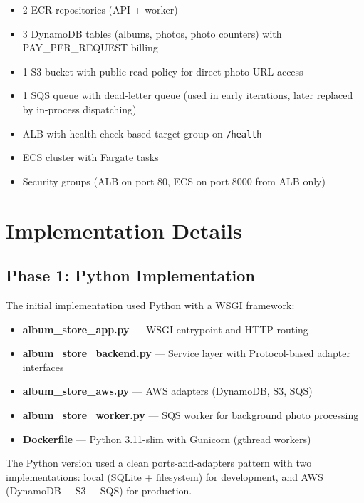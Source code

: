 \documentclass[11pt]{article}
\begin{document}
\begin{itemize}
    \item 2 ECR repositories (API + worker)
    \item 3 DynamoDB tables (albums, photos, photo counters) with PAY\_PER\_REQUEST billing
    \item 1 S3 bucket with public-read policy for direct photo URL access
    \item 1 SQS queue with dead-letter queue (used in early iterations, later replaced by in-process dispatching)
    \item ALB with health-check-based target group on \texttt{/health}
    \item ECS cluster with Fargate tasks
    \item Security groups (ALB on port 80, ECS on port 8000 from ALB only)
\end{itemize}

\section{Implementation Details}

\subsection{Phase 1: Python Implementation}

The initial implementation used Python with a WSGI framework:

\begin{itemize}
    \item \textbf{album\_store\_app.py} --- WSGI entrypoint and HTTP routing
    \item \textbf{album\_store\_backend.py} --- Service layer with Protocol-based adapter interfaces
    \item \textbf{album\_store\_aws.py} --- AWS adapters (DynamoDB, S3, SQS)
    \item \textbf{album\_store\_worker.py} --- SQS worker for background photo processing
    \item \textbf{Dockerfile} --- Python 3.11-slim with Gunicorn (gthread workers)
\end{itemize}

The Python version used a clean ports-and-adapters pattern with two implementations: local (SQLite + filesystem) for development, and AWS (DynamoDB + S3 + SQS) for production.
\end{document}
